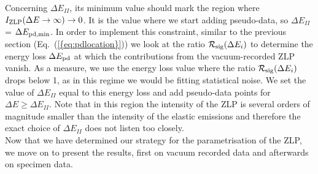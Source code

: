 Concerning $\Delta E_{II}$, its minimum value should mark the region where $I_{\rm ZLP}(\Delta E\to \infty)\to 0$. 
%
It is the value where we start adding pseudo-data, so $\Delta E_{II}$ = $\Delta E_{\rm pd,min}$.
%
In order to implement this constraint, similar to the previous section (Eq.~(\ref{{eq:pdlocation}}))
we look at the ratio 
$\mathcal{R}_{\rm sig}(\Delta E_i)$ to determine the energy loss $\Delta E_{\rm pd}$ at 
which the contributions from the vacuum-recorded ZLP vanish. 
%
As a measure, we use the energy loss value where the ratio $\mathcal{R}_{\rm sig}(\Delta E_i)$ drops below 1,
as in this regime we would be fitting statistical noise.
%
We set the value of $\Delta E_{II}$ equal to this energy loss and add pseudo-data points for $\Delta E \ge \Delta E_{II}$.
%
Note that in this region the intensity of the ZLP is several orders of magnitude smaller than the intensity 
of the elastic emissions and therefore the exact choice of $\Delta E_{II}$ does not listen too closely.\\

Now that we have determined our strategy for the parametrisation of the ZLP, we move on to present the results,
first on vacuum recorded data and afterwards on specimen data.
